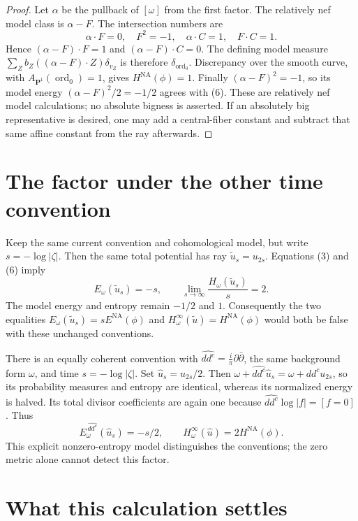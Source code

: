 \documentclass[11pt]{article}
\newcommand{\ddc}{dd^c}
\newcommand{\NA}{\mathrm{NA}}
\begin{document}
\begin{proof}
Let $\alpha$ be the pullback of $[\omega]$ from the first factor.
The relatively nef model class is $\alpha-F$.
The intersection numbers are
\[
 \alpha\cdot F=0,\quad F^2=-1,\quad
 \alpha\cdot C=1,\quad F\cdot C=1.
 \tag{10}
\]
Hence $(\alpha-F)\cdot F=1$ and
$(\alpha-F)\cdot C=0$. The defining model measure
$\sum_Z b_Z((\alpha-F)\cdot Z)\delta_{v_Z}$ is therefore
$\delta_{\operatorname{ord}_0}$. Discrepancy over the smooth
curve, with $A_{\mathbf P^1}(\operatorname{ord}_0)=1$, gives
$H^{\NA}(\phi)=1$.
Finally $(\alpha-F)^2=-1$, so its model energy
$(\alpha-F)^2/2=-1/2$ agrees with (6).
These are relatively nef model calculations; no absolute bigness
is asserted. If an absolutely big representative is desired,
one may add a central-fiber constant and subtract that same
affine constant from the ray afterwards.
\end{proof}

\section{The factor under the other time convention}

Keep the same current convention and cohomological model, but
write $s=-\log|\zeta|$. Then the same total potential has ray
$\widetilde u_s=u_{2s}$. Equations (3) and (6) imply
\[
 E_\omega(\widetilde u_s)=-s,\qquad
 \lim_{s\to\infty}\frac{H_\omega(\widetilde u_s)}s=2.
 \tag{11}
\]
The model energy and entropy remain $-1/2$ and $1$.
Consequently the two equalities
$E_\omega(\widetilde u_s)=sE^{\NA}(\phi)$ and
$H_\omega^\infty(\widetilde u)=H^{\NA}(\phi)$ would both be false
with these unchanged conventions.

There is an equally coherent convention with
$\widehat{\ddc}=\frac{i}{\pi}\partial\bar\partial$,
the same background form $\omega$, and time $s=-\log|\zeta|$.
Set $\widehat u_s=u_{2s}/2$. Then
$\omega+\widehat{\ddc}\widehat u_s=\omega+\ddc u_{2s}$,
so its probability measures and entropy are identical, whereas
its normalized energy is halved. Its total divisor coefficients
are again one because
$\widehat{\ddc}\log|f|=[f=0]$. Thus
\[
 E_\omega^{\,\widehat{\ddc}}(\widehat u_s)=-s/2,\qquad
 H_\omega^\infty(\widehat u)=2H^{\NA}(\phi).
 \tag{12}
\]
This explicit nonzero-entropy model distinguishes the conventions;
the zero metric alone cannot detect this factor.

\section{What this calculation settles}
\end{document}
